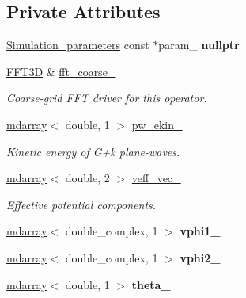 \subsection*{Private Attributes}
\begin{DoxyCompactItemize}
\item 
\hypertarget{classsirius_1_1_local__operator_a51c6ca9c6201386bef9fc34970baf883}{}\hyperlink{classsirius_1_1_simulation__parameters}{Simulation\+\_\+parameters} const $\ast$param\+\_\+ {\bfseries nullptr}\label{classsirius_1_1_local__operator_a51c6ca9c6201386bef9fc34970baf883}

\item 
\hyperlink{classsddk_1_1_f_f_t3_d}{F\+F\+T3\+D} \& \hyperlink{classsirius_1_1_local__operator_aa1bc472b5b0e2ef1b496764db3feed92}{fft\+\_\+coarse\+\_\+}
\begin{DoxyCompactList}\small\item\em Coarse-\/grid F\+F\+T driver for this operator. \end{DoxyCompactList}\item 
\hyperlink{classsddk_1_1mdarray}{mdarray}$<$ double, 1 $>$ \hyperlink{classsirius_1_1_local__operator_aedbceadfd55a100333a99a641aabf154}{pw\+\_\+ekin\+\_\+}
\begin{DoxyCompactList}\small\item\em Kinetic energy of G+k plane-\/waves. \end{DoxyCompactList}\item 
\hyperlink{classsddk_1_1mdarray}{mdarray}$<$ double, 2 $>$ \hyperlink{classsirius_1_1_local__operator_a2b0378568482509732db3952f4dc00c4}{veff\+\_\+vec\+\_\+}
\begin{DoxyCompactList}\small\item\em Effective potential components. \end{DoxyCompactList}\item 
\hypertarget{classsirius_1_1_local__operator_a5abe267f9ac871cdee5b8a9c4da9540f}{}\hyperlink{classsddk_1_1mdarray}{mdarray}$<$ double\+\_\+complex, 1 $>$ {\bfseries vphi1\+\_\+}\label{classsirius_1_1_local__operator_a5abe267f9ac871cdee5b8a9c4da9540f}

\item 
\hypertarget{classsirius_1_1_local__operator_a02c46e60c2e63850bc20c054d9463030}{}\hyperlink{classsddk_1_1mdarray}{mdarray}$<$ double\+\_\+complex, 1 $>$ {\bfseries vphi2\+\_\+}\label{classsirius_1_1_local__operator_a02c46e60c2e63850bc20c054d9463030}

\item 
\hypertarget{classsirius_1_1_local__operator_ab1474fb9351ae264906355f83b68204e}{}\hyperlink{classsddk_1_1mdarray}{mdarray}$<$ double, 1 $>$ {\bfseries theta\+\_\+}\label{classsirius_1_1_local__operator_ab1474fb9351ae264906355f83b68204e}


\end{DoxyCompactItemize}
